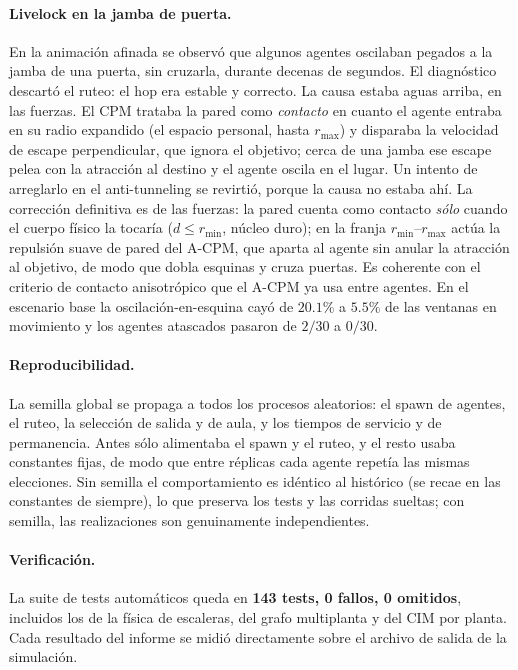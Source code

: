 \documentclass[11pt,a4paper]{article}
\begin{document}
\paragraph{Livelock en la jamba de puerta.}
En la animación afinada se observó que algunos agentes oscilaban pegados a la jamba de una puerta,
sin cruzarla, durante decenas de segundos. El diagnóstico descartó el ruteo: el hop era estable y
correcto. La causa estaba aguas arriba, en las fuerzas. El CPM trataba la pared como
\emph{contacto} en cuanto el agente entraba en su radio expandido (el espacio personal, hasta
$r_{\max}$) y disparaba la velocidad de escape perpendicular, que ignora el objetivo; cerca de una
jamba ese escape pelea con la atracción al destino y el agente oscila en el lugar. Un intento de
arreglarlo en el anti-tunneling se revirtió, porque la causa no estaba ahí. La corrección definitiva es de
las fuerzas: la pared cuenta como contacto \emph{sólo} cuando el cuerpo físico la tocaría
($d \le r_{\min}$, núcleo duro); en la franja $r_{\min}$--$r_{\max}$ actúa la repulsión suave de
pared del A-CPM, que aparta al agente sin anular la atracción al objetivo, de modo que dobla
esquinas y cruza puertas. Es coherente con el criterio de contacto anisotrópico que el A-CPM ya
usa entre agentes. En el escenario base la oscilación-en-esquina cayó de $20.1\%$ a $5.5\%$ de las
ventanas en movimiento y los agentes atascados pasaron de $2/30$ a $0/30$.

\paragraph{Reproducibilidad.}
La semilla global se propaga a todos los procesos aleatorios: el spawn de agentes, el ruteo, la
selección de salida y de aula, y los tiempos de servicio y de permanencia. Antes sólo alimentaba
el spawn y el ruteo, y el resto usaba constantes fijas, de modo que entre réplicas cada agente
repetía las mismas elecciones. Sin semilla el comportamiento es idéntico al histórico (se recae en
las constantes de siempre), lo que preserva los tests y las corridas sueltas; con semilla, las
realizaciones son genuinamente independientes.

\paragraph{Verificación.}
La suite de tests automáticos queda en \textbf{143 tests, 0 fallos, 0 omitidos}, incluidos los
de la física de escaleras, del grafo multiplanta y del CIM por planta. Cada resultado del
informe se midió directamente sobre el archivo de salida de la simulación.
\end{document}
